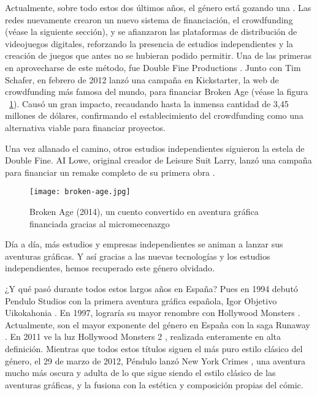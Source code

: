 Actualmente, sobre todo estos dos últimos años, el género está gozando una . Las redes nuevamente crearon un nuevo sistema de financiación, el crowdfunding (véase la siguiente sección), y se afianzaron las plataformas de distribución de videojuegos digitales, reforzando la presencia de estudios independientes y la creación de juegos que antes no se hubieran podido permitir. Una de las primeras en aprovecharse de este método, fue Double Fine Productions . Junto con Tim Schafer, en febrero de 2012 lanzó una campaña en Kickstarter, la web de crowdfunding más famosa del mundo, para financiar Broken Age  (véase la figura ~\ref{fig:broken-age}). Causó un gran impacto, recaudando hasta la inmensa cantidad de 3,45 millones de dólares, confirmando el establecimiento del crowdfunding como una alternativa viable para financiar proyectos.

Una vez allanado el camino, otros estudios independientes siguieron la estela de Double Fine. AI Lowe, original creador de Leisure Suit Larry, lanzó una campaña para financiar un remake completo de su primera obra . 

\begin{figure}[H] 
  \begin{center}
    \texttt{[image: broken-age.jpg]}
  \end{center}
  \caption{Broken Age (2014), un cuento convertido en aventura gráfica financiada gracias al micromecenazgo}
    \label{fig:broken-age}
\end{figure}

Día a día, más estudios y empresas independientes se animan a lanzar sus aventuras gráficas. Y así gracias a las nuevas tecnologías y los estudios independientes, hemos recuperado este género olvidado.

¿Y qué pasó durante todos estos largos años en España? Pues en 1994 debutó Pendulo Studios  con la primera aventura gráfica española, Igor Objetivo Uikokahonia . En 1997, lograría su mayor renombre con Hollywood Monsters . Actualmente, son el mayor exponente del género en España con la saga Runaway . En 2011 ve la luz Hollywood Monsters 2 , realizada enteramente en alta definición. Mientras que todos estos títulos siguen el más puro estilo clásico del género, el 29 de marzo de 2012, Péndulo lanzó New York Crimes , una aventura mucho más oscura y adulta de lo que sigue siendo el estilo clásico de las aventuras gráficas,  y la fusiona con la estética y composición propias del cómic.

